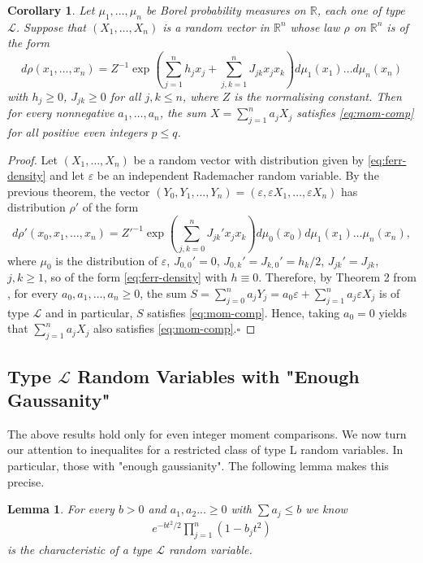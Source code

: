 \documentclass[10pt]{article}
\newcommand{\e}{\varepsilon}
\newcommand{\1}{\textbf{1}}
\newcommand{\R}{\mathbb{R}}
\newcommand{\sL}{\mathcal{L}}
\newtheorem{lemma}[theorem]{Lemma}
\newtheorem{corollary}[theorem]{Corollary}
\theoremstyle{remark}
\theoremstyle{definition}
\begin{document}
\begin{corollary}\label{cor:ferr}
Let $\mu_1, ..., \mu_n$ be Borel probability measures on $\R$, each one of type $\mathcal{L}$. Suppose that $(X_1,\dots,X_n)$ is a random vector in $\R^n$ whose law $\rho$ on $\R^n$ is of the form
\begin{equation}\label{eq:ferr-density}
d\rho(x_1,\ldots,x_n) = Z^{-1}\exp\left(\sum_{j=1}^n h_jx_j+\sum_{j,k=1}^n J_{jk}x_jx_k\right)d\mu_1(x_1)\dots d\mu_n(x_n)
\end{equation}
with $h_j \geq 0$, $J_{jk} \geq 0$ for all $j,k \leq n$, where $Z$ is the normalising constant. Then for every nonnegative $a_1, \ldots, a_n$, the sum $X = \sum_{j=1}^n a_jX_j$ satisfies \eqref{eq:mom-comp} for all positive even integers $p \leq q$.
\end{corollary}

\begin{proof}
	Let $(X_1, \ldots, X_n)$ be a random vector with distribution given by \eqref{eq:ferr-density} and let $\varepsilon$ be an independent Rademacher random variable. By the previous theorem, the vector $(Y_0,Y_1,\dots,Y_n) = (\e,\e X_1,\dots,\e X_n)$ has distribution $\rho'$ of the form
\[
d\rho'(x_0,x_1,\ldots,x_n) = Z'^{-1}\exp\left(\sum_{j,k=0}^n J_{jk}'x_jx_k\right)d\mu_0(x_0)d\mu_1(x_1)\dots\mu_n(x_n),
\]
where $\mu_0$ is the distribution of $\varepsilon$, $J_{0,0}' = 0$, $J_{0,k}' = J_{k,0}'= h_k/2$, $J_{jk}' = J_{jk}$, $j,k \geq 1$, so of the form \eqref{eq:ferr-density} with $h \equiv 0$. Therefore, by Theorem 2 from \cite{N}, for every $a_0, a_1,\dots, a_n \geq 0$, the sum $S = \sum_{j=0}^n a_jY_j = a_0\e + \sum_{j=1}^n a_j\e X_j$ is of type $\sL$ and in particular, $S$ satisfies \eqref{eq:mom-comp}. Hence, taking $a_0 = 0$ yields that $\sum_{j=1}^n a_jX_j$ also satisfies \eqref{eq:mom-comp}.\hfill$\square$
\end{proof}

\subsection{Type $\mathcal{L}$ Random Variables with "Enough Gaussanity"}

The above results hold only for even integer moment comparisons. We now turn our attention to inequalites for a restricted class of type L random variables. In particular, those with "enough gaussianity". The following lemma makes this precise.

\begin{lemma}
	For every $b > 0$ and $a_1,a_2...\geq 0$ with $\sum a_j \leq b$ we know
	\begin{align*}
		e^{-bt^2/2}\prod_{j=1}^n (1-b_jt^2)
	\end{align*} 
	is the characteristic of a type $\mathcal{L}$ random variable. 
\end{lemma}
\end{document}
